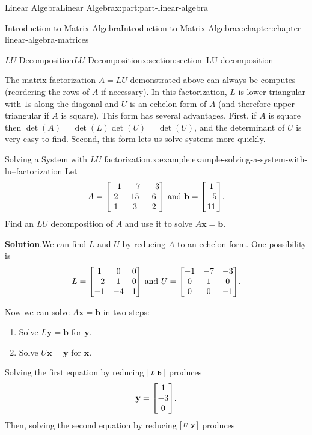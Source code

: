 \documentclass[twoside,10pt,]{book}
\newcommand{\blocktitlefont}{\relax}
\numberwithin{equation}{part}
\providecommand{\vb}[1]{\mathbf{#1}}
\begin{document}
\begin{partptx}{Linear Algebra}{}{Linear Algebra}{}{}{x:part:part-linear-algebra}
\begin{chapterptx}{Introduction to Matrix Algebra}{}{Introduction to Matrix Algebra}{}{}{x:chapter:chapter-linear-algebra-matrices}
\begin{sectionptx}{\(LU\) Decomposition}{}{\(LU\) Decomposition}{}{}{x:section:section--LU-decomposition}
%
\par
The matrix factorization \(A = LU\) demonstrated above can always be computes (reordering the rows of \(A\) if necessary). In this factorization, \(L\) is lower triangular with \(1\)s along the diagonal and \(U\) is an echelon form of \(A\) (and therefore upper triangular if \(A\) is square). This form has several advantages. First, if \(A\) is square then \(\det(A) = \det(L)\det(U) = \det(U)\), and the determinant of \(U\) is very easy to find. Second, this form lets us solve systems more quickly.%
\begin{example}{Solving a System with \(LU\) factorization.}{x:example:example-solving-a-system-with-lu--factorization}%
Let%
\begin{equation*}
A = \mqty[-1 & -7 & -3 \\ 2 & 15 & 6 \\ 1 & 3 & 2]\text{ and }\vb{b} = \mqty[1 \\ -5 \\ 11].
\end{equation*}
Find an \(LU\) decomposition of \(A\) and use it to solve \(A\vb{x} = \vb{b}\).%
\par\smallskip%
\noindent\textbf{\blocktitlefont Solution}.\hypertarget{g:solution:idm1630943032}{}\quad{}We can find \(L\) and \(U\) by reducing \(A\) to an echelon form. One possibility is%
\begin{equation*}
L = \mqty[1 & 0 & 0 \\ -2 & 1 & 0 \\ -1 & -4 & 1]\text{ and }U = \mqty[-1 & -7 & -3 \\ 0 & 1 & 0 \\ 0 & 0 & -1].
\end{equation*}
%
\par
Now we can solve \(A\vb{x} = \vb{b}\) in two steps:%
\begin{enumerate}
\item{}Solve \(L\vb{y} = \vb{b}\) for \(\vb{y}\).%
\item{}Solve \(U\vb{x} = \vb{y}\) for \(\vb{x}\).%
\end{enumerate}
Solving the first equation by reducing \(\smqty[L & \vb{b}]\) produces%
\begin{equation*}
\vb{y} = \mqty[1 \\ -3 \\ 0]\text{.}
\end{equation*}
Then, solving the second equation by reducing \(\smqty[U & \vb{y}]\) produces%
\begin{equation*}

\end{equation*}
\end{example}
\end{sectionptx}
\end{chapterptx}
\end{partptx}
\end{document}
